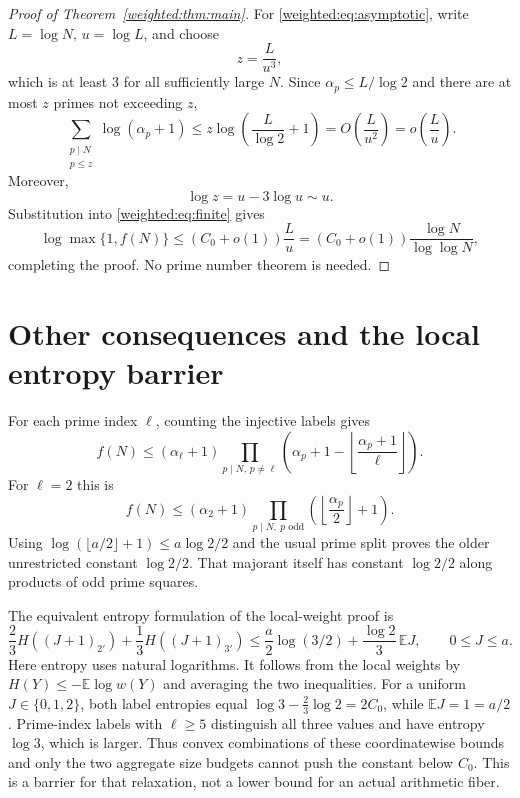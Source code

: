 \begin{proof}[Proof of Theorem~\ref{weighted:thm:main}]
For \eqref{weighted:eq:asymptotic}, write $L=\log N$, $u=\log L$, and choose
\[
z=\frac{L}{u^3},
\]
which is at least $3$ for all sufficiently large $N$. Since $\alpha_p\le L/\log2$ and there are at most $z$ primes not exceeding $z$,
\[
\sum_{\substack{p\mid N\\p\le z}}\log(\alpha_p+1)
\le z\log\!\left(\frac L{\log2}+1\right)
=O\!\left(\frac L{u^2}\right)
=o\!\left(\frac L u\right).
\]
Moreover,
\[
\log z=u-3\log u\sim u.
\]
Substitution into \eqref{weighted:eq:finite} gives
\[
\log\max\{1,f(N)\}
\le(C_0+o(1))\frac L u
=(C_0+o(1))\frac{\log N}{\log\log N},
\]
completing the proof. No prime number theorem is needed.
\end{proof}


\section{Other consequences and the local entropy barrier}
For each prime index $\ell$, counting the injective labels gives
\[
 f(N)\le(\alpha_\ell+1)\prod_{p\mid N,\,p\ne\ell}
 \left(\alpha_p+1-\left\lfloor\frac{\alpha_p+1}{\ell}\right\rfloor\right).
\]
For $\ell=2$ this is
\[
 f(N)\le(\alpha_2+1)\prod_{p\mid N,\ p\text{ odd}}
 \left(\left\lfloor\frac{\alpha_p}{2}\right\rfloor+1\right).
\]
Using $\log(\lfloor a/2\rfloor+1)\le a\log2/2$ and the usual prime split
proves the older unrestricted constant $\log2/2$. That majorant itself has
constant $\log2/2$ along products of odd prime squares.

The equivalent entropy formulation of the local-weight proof is
\[
 \frac23H((J+1)_{2'})+\frac13H((J+1)_{3'})
 \le\frac a2\log(3/2)+\frac{\log2}{3}\,\mathbb EJ,
 \qquad 0\le J\le a.
\]
Here entropy uses natural logarithms. It follows from the local weights by
$H(Y)\le-\mathbb E\log w(Y)$ and averaging the two inequalities. For a uniform
$J\in\{0,1,2\}$, both label entropies equal
$\log3-\tfrac23\log2=2C_0$, while $\mathbb EJ=1=a/2$.
Prime-index labels with $\ell\ge5$ distinguish all three values and have
entropy $\log3$, which is larger. Thus convex combinations of these
coordinatewise bounds and only the two aggregate size budgets cannot push the
constant below $C_0$. This is a barrier for that relaxation, not a lower bound
for an actual arithmetic fiber.
